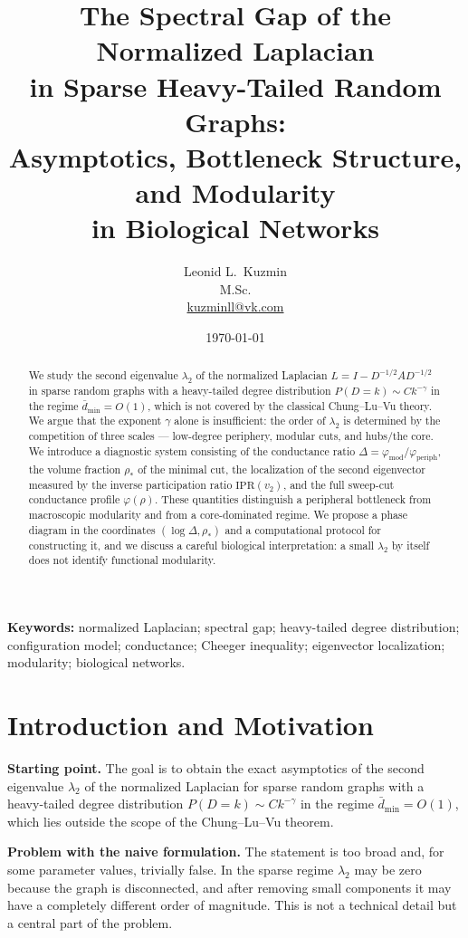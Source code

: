 \documentclass[11pt,a4paper]{article}
\title{\bfseries The Spectral Gap of the Normalized Laplacian\\
in Sparse Heavy-Tailed Random Graphs:\\
Asymptotics, Bottleneck Structure, and Modularity\\
in Biological Networks}
\author{Leonid L.~Kuzmin\\[2pt]
\small M.Sc.\\
\small\href{mailto:kuzminll@vk.com}{kuzminll@vk.com}}
\date{\today}
\theoremstyle{plain}
\theoremstyle{definition}
\theoremstyle{remark}
\newcommand{\periph}{\mathrm{periph}}
\newcommand{\modu}{\mathrm{mod}}
\newcommand{\Ph}{\varphi}
\newcommand{\dbar}{\bar d}
\newcommand{\lamtwo}{\lambda_2}
\begin{document}
\maketitle

\begin{abstract}
\noindent
We study the second eigenvalue $\lamtwo$ of the normalized Laplacian
$L=I-D^{-1/2}AD^{-1/2}$ in sparse random graphs with a heavy-tailed degree
distribution $P(D=k)\sim Ck^{-\gamma}$ in the regime $\dbar_{\min}=O(1)$,
which is not covered by the classical Chung--Lu--Vu theory. We argue that the
exponent $\gamma$ alone is insufficient: the order of $\lamtwo$ is determined
by the competition of three scales --- low-degree periphery, modular cuts, and
hubs/the core. We introduce a diagnostic system consisting of the conductance
ratio $\Delta=\Ph_{\modu}/\Ph_{\periph}$, the volume fraction $\rho_*$ of the
minimal cut, the localization of the second eigenvector measured by the inverse
participation ratio $\mathrm{IPR}(v_2)$, and the full sweep-cut conductance
profile $\Ph(\rho)$. These quantities distinguish a peripheral bottleneck from
macroscopic modularity and from a core-dominated regime. We propose a phase
diagram in the coordinates $(\log\Delta,\rho_*)$ and a computational protocol
for constructing it, and we discuss a careful biological interpretation: a
small $\lamtwo$ by itself does not identify functional modularity.
\end{abstract}

\noindent\textbf{Keywords:} normalized Laplacian; spectral gap; heavy-tailed
degree distribution; configuration model; conductance; Cheeger inequality;
eigenvector localization; modularity; biological networks.

\tableofcontents

\section{Introduction and Motivation}
\label{sec:motivation}

\textbf{Starting point.} The goal is to obtain the exact asymptotics of the
second eigenvalue $\lamtwo$ of the normalized Laplacian for sparse random
graphs with a heavy-tailed degree distribution $P(D=k)\sim Ck^{-\gamma}$ in the
regime $\dbar_{\min}=O(1)$, which lies outside the scope of the
Chung--Lu--Vu theorem.

\textbf{Problem with the naive formulation.} The statement is too broad and,
for some parameter values, trivially false. In the sparse regime $\lamtwo$ may
be zero because the graph is disconnected, and after removing small components
it may have a completely different order of magnitude. This is not a technical
detail but a central part of the problem.
\end{document}

